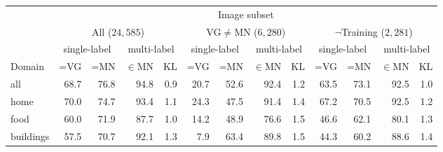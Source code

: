 %
%
%
\begin{table}[t]
	\centering
	\small
	\begin{tabular}{l@{~}|@{~}r@{~}r@{~}rr@{~}|@{~}r@{~}r@{~}rr@{~}|@{~}r@{~}r@{~}rr}
		\toprule
		& \multicolumn{12}{c}{Image subset} \\
		&	\multicolumn{4}{c}{All ($24,585$)} 
		& \multicolumn{4}{c}{VG$\neq$MN ($6,280$)}
		& \multicolumn{4}{c}{$\neg$Training ($2,281$)} \\
		\midrule
		&  \multicolumn{2}{c}{single-label}
		&  \multicolumn{2}{c}{multi-label}
		&  \multicolumn{2}{c}{single-label}
		&  \multicolumn{2}{c}{multi-label}
		&  \multicolumn{2}{c}{single-label}
		&  \multicolumn{2}{c}{multi-label} \\
		Domain	 &  =VG & =MN & $\in$MN  &  KL
		&  =VG & =MN & $\in$MN  & KL
		&  =VG & =MN & $\in$MN  & KL\\ 
		\midrule \vspace{.6ex}
		all            &               68.7 &                 76.8 &                   94.8 &            0.9 &            20.7 &              52.6 &                92.4 &         1.2 &             63.5 &               73.1 &                 92.5 &          1.0 \\ 
		home           &               70.0 &                 74.7 &                   93.4 &            1.1 &            24.3 &              47.5 &                91.4 &         1.4 &             67.2 &               70.5 &                 92.5 &          1.2 \\
		food           &               60.0 &                 71.9 &                   87.7 &            1.0 &            14.2 &              48.9 &                76.6 &         1.5 &             46.6 &               62.1 &                 80.1 &          1.3 \\
		buildings      &               57.5 &                 70.7 &                   92.1 &            1.3 &             7.9 &              63.4 &                89.8 &         1.5 &             44.3 &               60.2 &                 88.6 &          1.4 \\

\end{tabular}
\end{table}
